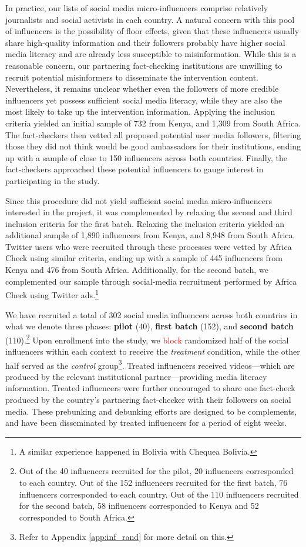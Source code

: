 In practice, our lists of social media micro-influencers comprise relatively journalists and social activists in each country. A natural concern with this pool of influencers is the possibility of floor effects, given that these influencers usually share high-quality information and their followers probably have higher social media literacy and are already less susceptible to misinformation. While this is a reasonable concern, our partnering fact-checking institutions are unwilling to recruit potential misinformers to disseminate the intervention content. Nevertheless, it remains unclear whether even the followers of more credible influencers yet possess sufficient social media literacy, while they are also the most likely to take up the intervention information. Applying the inclusion criteria yielded an initial sample of 732 from Kenya, and 1,309 from South Africa. The fact-checkers then vetted all proposed potential user media followers, filtering those they did not think would be good ambassadors for their institutions, ending up with a sample of close to 150 influencers across both countries. Finally, the fact-checkers approached these potential influencers to gauge interest in participating in the study.

Since this procedure did not yield sufficient social media micro-influencers interested in the project, it was complemented by relaxing the second and third inclusion criteria for the first batch. Relaxing the inclusion criteria yielded an additional sample of 1,890 influencers from Kenya, and 8,948 from South Africa. Twitter users who were recruited through these processes were vetted by Africa Check using similar criteria, ending up with a sample of 445 influencers from Kenya and  476 from South Africa. Additionally, for the second batch, we complemented our sample through social-media recruitment performed by Africa Check using Twitter ads.\footnote{A similar experience happened in Bolivia with Chequea Bolivia.} 

We have recruited a total of 302 social media influencers across both countries in what we denote three phases: \textbf{pilot} (40), \textbf{first batch} (152), and \textbf{second batch} (110).\footnote{Out of the 40 influencers recruited for the pilot, 20 influencers corresponded to each country. Out of the 152 influencers recruited for the first batch, 76 influencers corresponded to each country. Out of the 110 influencers recruited for the second batch, 58 influencers corresponded to Kenya and 52 corresponded to South Africa.} Upon enrollment into the study, we \textcolor{red}{block} randomized half of the social influencers within each context to receive the \textit{treatment} condition, while the other half served as the \textit{control} group\footnote{Refer to Appendix \ref{app:inf_rand} for more detail on this.}. Treated influencers received videos---which are produced by the relevant institutional partner---providing media literacy information. Treated influencers were further  encouraged to share one fact-check produced by the country's partnering fact-checker with their followers on social media. These prebunking and debunking efforts are designed to be complements, and have been disseminated by treated influencers for a period of eight weeks. 

